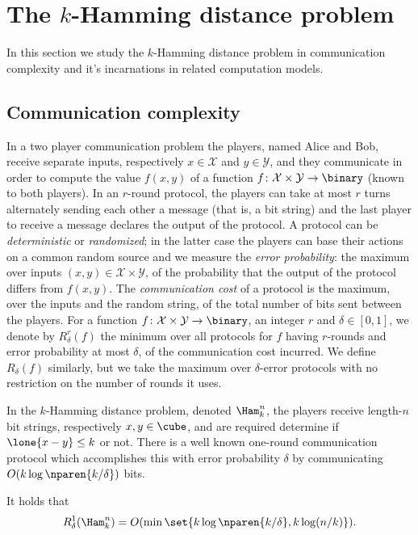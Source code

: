 \chapter{The $k$-Hamming distance problem}
\label{sec:ham:intro}

In this section we study the $k$-Hamming distance
problem in communication complexity and
it's incarnations in related computation models.

\section{Communication complexity}
In a two player communication problem the players, 
named Alice and Bob, receive separate inputs, 
respectively $x\in \mathcal{X}$ and $y\in \mathcal{Y}$, 
and they communicate in order to compute the value 
$f(x,y)$ of a function
$f\colon \mathcal{X}\times \mathcal{Y}\to\binary$ 
(known to both players). 
In an $r$-round protocol, the players can take at most 
$r$ turns alternately sending each other a message 
(that is, a bit string) and the last player to receive 
a message declares the output of the protocol.
A protocol can be {\em deterministic} or {\em randomized}; 
in the latter case the players can base their actions on 
a common random source and we measure the 
{\em error probability}: the maximum over inputs 
$(x,y)\in \mathcal{X}\times\mathcal{Y}$, of the probability 
that the output of the protocol differs from $f(x,y)$. 
The {\em communication cost} of a protocol is the maximum, 
over the inputs and the random string, of the total number 
of bits sent between the players.
For a function 
$f\colon \mathcal{X}\times\mathcal{Y}\to\binary$, 
an integer $r$ and $\delta\in[0,1]$, we denote by 
$R^r_{\delta}(f)$ the minimum over all protocols
for $f$ having $r$-rounds and error probability at most 
$\delta$, of the communication cost incurred. We define 
$R_{\delta}(f)$ similarly, but we take the maximum over 
$\delta$-error protocols with no restriction on the number 
of rounds it uses.

In the $k$-Hamming distance problem, denoted $\Ham^n_k$,
the players receive length-$n$ bit strings, respectively 
$x,y\in\cube$, and are required determine if 
$\lone{x-y}\le k$ or not.
There is a well known one-round communication protocol
which accomplishes this with error probability $\delta$ 
by communicating $O(k\log\nparen{k/\delta})$ bits.

\begin{theorem}
\label{thm:ub}
It holds that $$R^1_\delta(\Ham^n_k) = 
O(\min\set{k\log\nparen{k/\delta}, k\log (n/k)}).$$
\end{theorem}

